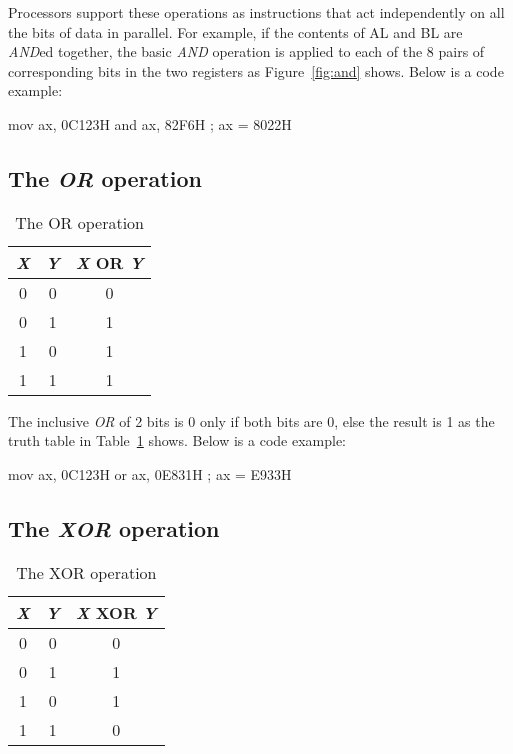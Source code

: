 Processors support these operations as instructions that act 
independently on all the bits of data in parallel. For example, if the contents
of {\code AL} and {\code BL} are \emph{AND}ed together, the basic \emph{AND}
operation is applied to each of the 8 pairs of corresponding bits in the
two registers as Figure~\ref{fig:and} shows. Below is a code example:
\begin{AsmCodeListing}[frame=none]
      mov    ax, 0C123H
      and    ax, 82F6H          ; ax = 8022H
\end{AsmCodeListing}

\subsection{The \emph{OR} operation}

\begin{table}[t]
\centering
\begin{tabular}{|c|c|c|}
\hline
\emph{X} & \emph{Y} & \emph{X} OR \emph{Y} \\
\hline \hline
0 & 0 & 0 \\
0 & 1 & 1 \\
1 & 0 & 1 \\
1 & 1 & 1 \\
\hline
\end{tabular}
\caption{The OR operation \label{tab:or} }
\end{table}


The inclusive \emph{OR} of 2 bits is 0 only if both bits are 0, else
the result is 1 as the truth table in Table~\ref{tab:or} shows. Below
is a code example:

\begin{AsmCodeListing}[frame=none]
      mov    ax, 0C123H
      or     ax, 0E831H          ; ax = E933H
\end{AsmCodeListing}

\subsection{The \emph{XOR} operation}

\begin{table}
\centering
\begin{tabular}{|c|c|c|}
\hline
\emph{X} & \emph{Y} & \emph{X} XOR \emph{Y} \\
\hline \hline
0 & 0 & 0 \\
0 & 1 & 1 \\
1 & 0 & 1 \\
1 & 1 & 0 \\
\hline
\end{tabular}
\caption{The XOR operation \label{tab:xor}}
\end{table}


